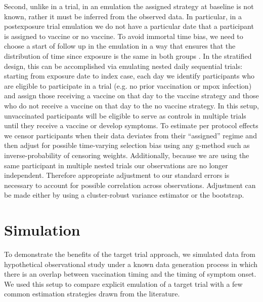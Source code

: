 \documentclass[11pt]{article}
\begin{document}
Second, unlike in a trial, in an emulation the assigned strategy at baseline is not known, rather it must be inferred from the observed data. In particular, in a postexposure trial emulation we do not have a particular date that a participant is assigned to vaccine or no vaccine. To avoid immortal time bias, we need to choose a start of follow up in the emulation in a way that ensures that the distribution of time since exposure is the same in both groups \cite{hernan2016specifying}. In the stratified design, this can be accomplished via emulating nested daily sequential trials: starting from exposure date to index case, each day we identify participants who are eligible to participate in a trial (e.g. no prior vaccination or mpox infection) and assign those receiving a vaccine on that day to the vaccine strategy and those who do not receive a vaccine on that day to the no vaccine strategy. In this setup, unvaccinated participants will be eligible to serve as controls in multiple trials until they receive a vaccine or develop symptoms. To estimate per protocol effects we censor participants when their data deviates from their ``assigned'' regime and then adjust for possible time-varying selection bias using any g-method such as inverse-probability of censoring weights. Additionally, because we are using the same participant in multiple nested trials our observations are no longer independent. Therefore appropriate adjustment to our standard errors is necessary to account for possible correlation across observations. Adjustment can be made either by using a cluster-robust variance estimator or the bootstrap.  

\section{Simulation}\label{sec:simulation}
To demonstrate the benefits of the target trial approach, we simulated data from hypothetical observational study under a known data generation process in which there is an overlap between vaccination timing and the timing of symptom onset. We used this setup to compare explicit emulation of a target trial with a few common estimation strategies drawn from the literature. 
\end{document}
